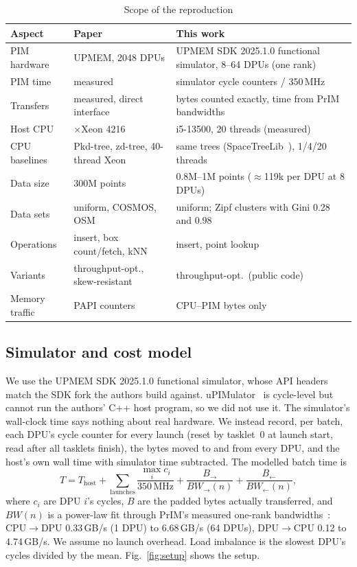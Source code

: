 \documentclass[conference]{IEEEtran}
\begin{document}
\begin{table}[!t]
\caption{Scope of the reproduction}
\label{tab:scope}
\centering
\footnotesize
\setlength{\tabcolsep}{3pt}
\begin{tabular}{@{}>{\raggedright\arraybackslash}p{}>{\raggedright\arraybackslash}p{}>{\raggedright\arraybackslash}p{}@{}}
\toprule
Aspect & Paper & This work \\
\midrule
PIM hardware & UPMEM, 2048 DPUs & UPMEM SDK 2025.1.0 functional simulator, 8--64 DPUs (one rank) \\
PIM time & measured & simulator cycle counters / 350\,MHz \\
Transfers & measured, direct interface & bytes counted exactly, time from PrIM bandwidths~\cite{prim} \\
Host CPU & 2$\times$Xeon 4216 & i5-13500, 20 threads (measured) \\
CPU baselines & Pkd-tree, zd-tree, 40-thread Xeon & same trees (SpaceTreeLib~\cite{psi}), 1/4/20 threads \\
Data size & 300M points & 0.8M--1M points ($\approx$119k per DPU at 8 DPUs) \\
Data sets & uniform, COSMOS, OSM & uniform; Zipf clusters with Gini 0.28 and 0.98 \\
Operations & insert, box count/fetch, kNN & insert, point lookup \\
Variants & throughput-opt., skew-resistant & throughput-opt.\ (public code) \\
Memory traffic & PAPI counters & CPU--PIM bytes only \\
\bottomrule
\end{tabular}
\end{table}

\subsection{Simulator and cost model}

We use the UPMEM SDK 2025.1.0 functional simulator, whose API headers match the SDK fork the authors build against.
uPIMulator~\cite{upimulator} is cycle-level but cannot run the authors' C++ host program, so we did not use it. The
simulator's wall-clock time says nothing about real hardware. We instead record, per batch, each DPU's cycle counter
for every launch (reset by tasklet~0 at launch start, read after all tasklets finish), the bytes moved to and from
every DPU, and the host's own wall time with simulator time subtracted. The modelled batch time is
\begin{equation}
T = T_{\mathrm{host}} + \sum_{\text{launches}} \frac{\max_i c_i}{350\,\mathrm{MHz}}
  + \frac{B_{\to}}{\mathit{BW}_{\to}(n)} + \frac{B_{\leftarrow}}{\mathit{BW}_{\leftarrow}(n)},
\end{equation}
where $c_i$ are DPU $i$'s cycles, $B$ are the padded bytes actually transferred, and $\mathit{BW}(n)$ is a power-law
fit through PrIM's measured one-rank bandwidths~\cite{prim}: CPU$\to$DPU 0.33\,GB/s (1 DPU) to 6.68\,GB/s (64 DPUs),
DPU$\to$CPU 0.12 to 4.74\,GB/s. We assume no launch overhead. Load imbalance is the slowest DPU's cycles divided by
the mean. Fig.~\ref{fig:setup} shows the setup.
\end{document}

